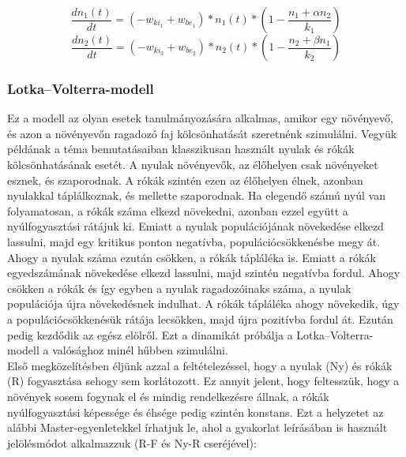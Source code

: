 \begin{multicols}{2}
\begin{equation} \label{eq:10}
    \frac{dn_1 \left( t \right)}{dt}
    =
    \left( -w_{ki_{1}} + w_{be_{1}} \right) * n_1 \left( t \right) * \left( 1 - \frac{n_1 + \alpha n_2}{k_1} \right)
\end{equation}
\begin{equation} \label{eq:11}
    \frac{dn_2 \left( t \right)}{dt}
    =
    \left( -w_{ki_{2}} + w_{be_{2}} \right) * n_2 \left( t \right) * \left( 1 - \frac{n_2 + \beta n_1}{k_2} \right)
\end{equation}

\subsubsection{Lotka--Volterra-modell} \label{subsub:3.1.3}
Ez a modell az olyan esetek tanulmányozására alkalmas, amikor egy növényevő, és azon a növényevőn ragadozó faj kölcsönhatását szeretnénk szimulálni. Vegyük példának a téma bemutatásaiban klasszikusan használt nyulak és rókák kölcsönhatásának esetét. A nyulak növényevők, az élőhelyen csak növényeket esznek, és szaporodnak. A rókák szintén ezen az élőhelyen élnek, azonban nyulakkal táplálkoznak, és mellette szaporodnak. Ha elegendő számú nyúl van folyamatosan, a rókák száma elkezd növekedni, azonban ezzel együtt a nyúlfogyasztási rátájuk ki. Emiatt a nyulak populációjának növekedése elkezd lassulni, majd egy kritikus ponton negatívba, populációcsökkenésbe megy át. Ahogy a nyulak száma ezután csökken, a rókák tápláléka is. Emiatt a rókák egyedszámának növekedése elkezd lassulni, majd szintén negatívba fordul. Ahogy csökken a rókák és így egyben a nyulak ragadozóinaks száma, a nyulak populációja újra növekedésnek indulhat. A rókák tápláléka ahogy növekedik, úgy a populációcsökkenésük rátája lecsökken, majd újra pozitívba fordul át. Ezután pedig kezdődik az egész elölről. Ezt a dinamikát próbálja a Lotka--Volterra-modell a valósághoz minél hűbben szimulálni. \\
Első megközelítésben éljünk azzal a feltételezéssel, hogy a nyulak (Ny) és rókák (R) fogyasztása sehogy sem korlátozott. Ez annyit jelent, hogy feltesszük, hogy a növények sosem fogynak el és mindig rendelkezésre állnak, a rókák nyúlfogyasztási képessége és éhsége pedig szintén konstans. Ezt a helyzetet az alábbi Master-egyenletekkel írhatjuk le, ahol a gyakorlat leírásában is használt jelölésmódot alkalmazzuk (R-F és Ny-R cseréjével):


\end{multicols}
